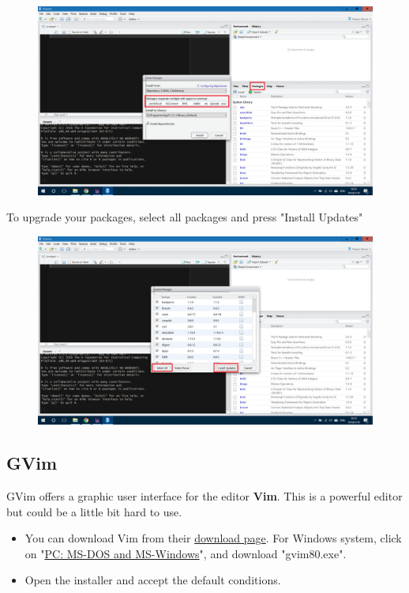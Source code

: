 \documentclass[11pt]{article} %
\begin{document}
\begin{itemize}
        \begin{figure}[h!]
          \centering
          \includegraphics[width=0.7\linewidth]{figs/installPackages}
          \caption{}
          \label{fig:installpackages}
        \end{figure}
        
        To upgrade your packages, select all packages and press "Install Updates"
        
        \begin{figure}[h!]
          \centering
          \includegraphics[width=0.7\linewidth]{figs/upgradePackages}
          \caption{}
          \label{fig:upgradepackages}
        \end{figure}
        
      \end{itemize}
    
    \subsection{GVim}
    
      GVim offers a graphic user interface for the editor \textbf{Vim}. 
      This is a powerful editor but could be a little bit hard to use. 
      \begin{itemize}
        \item You can download Vim from their \href{https://vim.sourceforge.io/download.php}{download page}. 
        For Windows system, click on "\href{https://vim.sourceforge.io/download.php#pc}{PC: MS-DOS and MS-Windows}", and download "gvim80.exe". 
        \item Open the installer and accept the default conditions. 
      \end{itemize}
\end{document}
